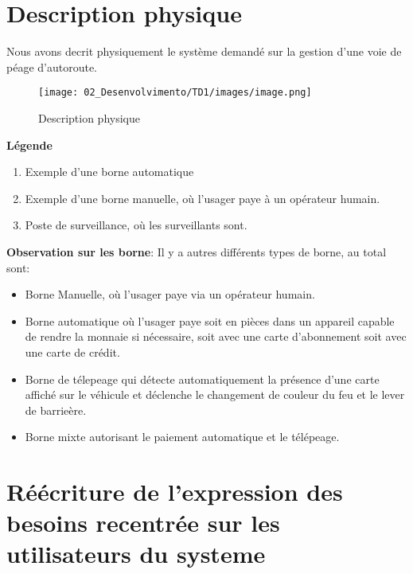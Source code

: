 \label{Cap:TD1}


\section{Description physique}
Nous avons decrit physiquement le système demandé sur la gestion d’une voie de péage d’autoroute.
\begin{figure}[h]
    \centering
    \texttt{[image: 02\_Desenvolvimento/TD1/images/image.png]}
    \caption{Description physique}
\end{figure}
\newpage
\textbf{Légende}
\begin{enumerate}
    \item Exemple d'une borne automatique
    \item Exemple d'une borne manuelle, où l'usager paye à un opérateur humain.
    \item Poste de surveillance, où les surveillants sont.
\end{enumerate}
    \textbf{Observation sur les borne}: Il y a autres différents types de borne, au total sont: 
    \begin{itemize}
        \item Borne Manuelle, où l'usager paye via un opérateur humain.
        \item Borne automatique où l'usager paye soit en pièces dans un appareil capable de rendre la monnaie si nécessaire, soit avec une carte d'abonnement soit avec une carte de crédit.
        \item Borne de télepeage qui détecte automatiquement la présence d'une carte affiché sur le véhicule et déclenche le changement de couleur du feu et le lever de barrieère.
        \item Borne mixte autorisant le paiement automatique et le télépeage.
    \end{itemize}
\newpage
\section{Réécriture de l'expression des besoins recentrée sur les utilisateurs du systeme}
